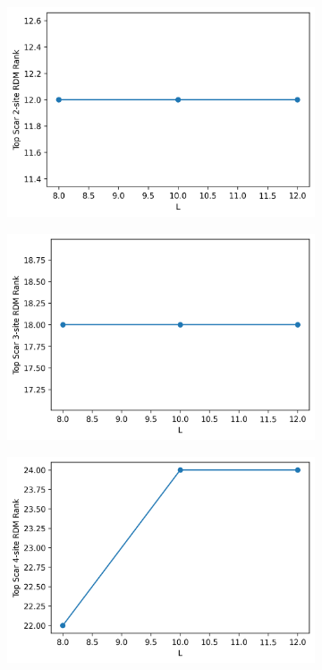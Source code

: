 \documentclass[11pt]{article}
\begin{document}
\begin{itemize}
\begin{itemize}
\begin{figure}[H]
    \centering
    \begin{subfigure}{0.45\textwidth}
        \includegraphics[width=\linewidth]{hb_scar_2s.png}
        \caption{}
        \label{fig:image1h}
    \end{subfigure}
    \begin{subfigure}{0.45\textwidth}
        \includegraphics[width=\linewidth]{hb_scar_3s.png}
        \caption{}
        \label{fig:image2hb}
    \end{subfigure}    %
    \begin{subfigure}{0.45\textwidth}
        \includegraphics[width=\linewidth]{hb_scar_4s.png}

\end{subfigure}
\end{figure}
\end{itemize}
\end{itemize}
\end{document}
